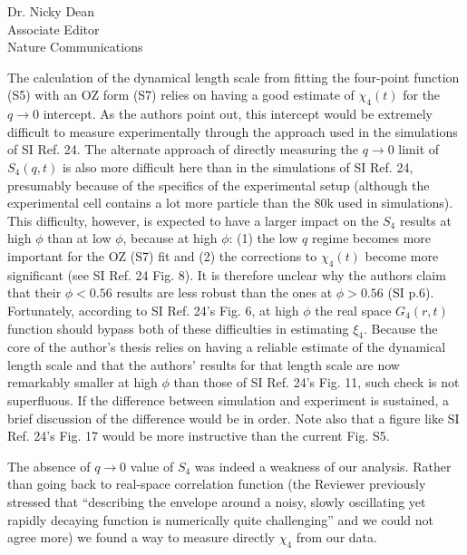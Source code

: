 \documentclass[a4paper, rebuttal, parskip=true, firsthead=false, fromemail=true, foldmarks=false]{scrlttr2}
\begin{document}
\begin{letter}{Dr. Nicky Dean\\
Associate Editor\\
Nature Communications}
\begin{quotationi}
The calculation of the dynamical length scale from fitting the four-point function (S5) with an OZ form (S7) relies on having a good estimate of $\chi_4(t)$ for the $q\rightarrow 0$ intercept. As the authors point out, this intercept would be extremely difficult to measure experimentally through the approach used in the simulations of SI Ref. 24. The alternate approach of directly measuring the $q\rightarrow 0$ limit of $S_4(q,t)$ is also more difficult here than in the simulations of SI Ref. 24, presumably because of the specifics of the experimental setup (although the experimental cell contains a lot more particle than the 80k used in simulations). This difficulty, however, is expected to have a larger impact on the $S_4$ results at high $\phi$ than at low $\phi$, because at high $\phi$: (1) the low $q$ regime becomes more important for the OZ (S7) fit and (2) the corrections to $\chi_4(t)$ become more significant (see SI Ref. 24 Fig. 8). It is therefore unclear why the authors claim that their $\phi<0.56$ results are less robust than the ones at $\phi>0.56$ (SI p.6). Fortunately, according to SI Ref. 24's Fig. 6, at high $\phi$ the real space $G_4(r,t)$ function should bypass both of these difficulties in estimating $\xi_4$. Because the core of the author's thesis relies on having a reliable estimate of the dynamical length scale and that the authors' results for that length scale are now remarkably smaller at high $\phi$ than those of SI Ref. 24's Fig. 11, such check is not superfluous. If the difference between simulation and experiment is sustained, a brief discussion of the difference would be in order. Note also that a figure like SI Ref. 24's Fig. 17 would be more instructive than the current Fig. S5.
\end{quotationi}

The absence of $q\rightarrow 0$ value of $S_4$ was indeed a weakness of our analysis. Rather than going back to real-space correlation function (the Reviewer previously stressed that ``describing the envelope around a noisy, slowly oscillating yet rapidly decaying function is numerically quite challenging'' and we could not agree more) we found a way to measure directly $\chi_4$ from our data.


\end{letter}
\end{document}
